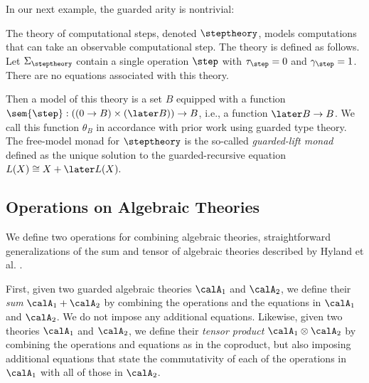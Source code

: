 \documentclass[acmsmall,screen,review,anonymous]{acmart}
\theoremstyle{remark}
\begin{document}
In our next example, the guarded arity is nontrivial:
%
\begin{example}\label{ex:steps}
    The theory of computational steps, denoted $\steptheory$, models computations that
    can take an observable computational step. The theory is defined as follows.
    Let $\Sigma_{\steptheory}$ contain a single operation $\step$ with $\tau_{\step} =
    0$ and $\gamma_{\step} = 1$. There are no equations associated with this
    theory.

    Then a model of this theory is a set $B$ equipped with a function
    $\sem{\step} : ((0 \to B) \times (\later B)) \to B$, i.e., a function
    $\later B \to B$. We call this function $\theta_B$ in accordance with prior
    work using guarded type theory.
    The free-model monad for $\steptheory$ is the so-called \emph{guarded-lift
    monad} \cite{mogelberg-paviotti2016} defined as the unique solution to the
    guarded-recursive equation
    $L(X) \cong X + \later L(X).$
\end{example}

\subsection{Operations on Algebraic Theories}

We define two operations for combining algebraic theories, straightforward
generalizations of the sum and tensor of algebraic theories described by Hyland
et al. \cite{HYLAND200670}.

First, given two guarded algebraic theories $\calA_1$ and $\calA_2$, we define their
\emph{sum} $\calA_1 + \calA_2$ by combining the operations and the equations in
$\calA_1$ and $\calA_2$. We do not impose any additional equations.
%
Likewise, given two theories $\calA_1$ and $\calA_2$, we define their
\emph{tensor product} $\calA_1 \otimes \calA_2$ by combining the operations and
equations as in the coproduct, but also imposing additional equations that state
the commutativity of each of the operations in $\calA_1$ with all of those in
$\calA_2$. 
\end{document}
